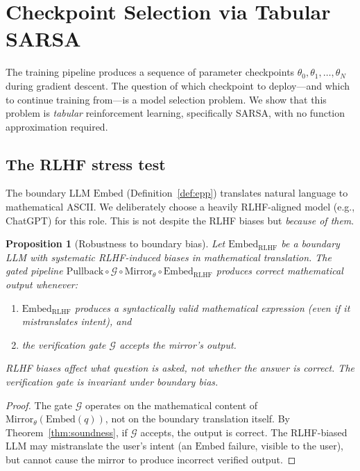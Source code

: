 \documentclass[11pt,a4paper]{article}
\newtheorem{proposition}[theorem]{Proposition}
\newcommand{\cG}{\mathcal{G}}
\newcommand{\Embed}{\mathrm{Embed}}
\newcommand{\Pullback}{\mathrm{Pullback}}
\newcommand{\Mirror}{\mathrm{Mirror}}
\begin{document}
\section{Checkpoint Selection via Tabular SARSA}\label{sec:sarsa}

The training pipeline produces a sequence of parameter checkpoints
$\theta_0, \theta_1, \ldots, \theta_N$ during gradient descent.
The question of which checkpoint to deploy---and which to continue
training from---is a model selection problem.
We show that this problem is \emph{tabular} reinforcement learning,
specifically SARSA, with no function approximation required.

\subsection{The RLHF stress test}

The boundary LLM $\Embed$ (Definition~\ref{def:epp}) translates
natural language to mathematical ASCII.
We deliberately choose a heavily RLHF-aligned model
(e.g., ChatGPT) for this role.
This is not despite the RLHF biases but \emph{because of them}.

\begin{proposition}[Robustness to boundary bias]\label{prop:rlhf}
Let $\Embed_{\mathrm{RLHF}}$ be a boundary LLM with
systematic RLHF-induced biases in mathematical translation.
The gated pipeline
$\Pullback \circ \cG \circ \Mirror_\theta \circ \Embed_{\mathrm{RLHF}}$
produces correct mathematical output whenever:
\begin{enumerate}[label=(\alph*),nosep]
\item $\Embed_{\mathrm{RLHF}}$ produces a syntactically valid
  mathematical expression (even if it mistranslates intent), and
\item the verification gate $\cG$ accepts the mirror's output.
\end{enumerate}
RLHF biases affect \emph{what question is asked}, not
\emph{whether the answer is correct}.
The verification gate is invariant under boundary bias.
\end{proposition}

\begin{proof}
The gate $\cG$ operates on the mathematical content of
$\Mirror_\theta(\Embed(q))$, not on the boundary translation
itself.
By Theorem~\ref{thm:soundness}, if $\cG$ accepts, the
output is correct.
The RLHF-biased LLM may mistranslate the user's intent
(an $\Embed$ failure, visible to the user), but cannot
cause the mirror to produce incorrect verified output.
\end{proof}
\end{document}
